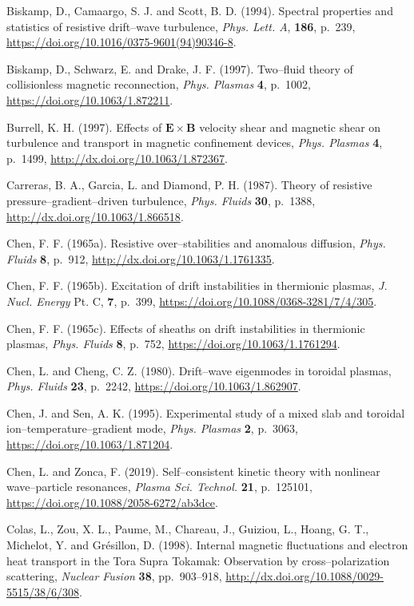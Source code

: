 \documentclass[a4paper,openany,12pt]{book}
\begin{document}
{\begin{thebibliography}{100}
\bibitem{}
Biskamp, D., Camaargo, S. J. and Scott, B. D. (1994). Spectral properties and statistics of resistive drift--wave turbulence, {\em Phys. Lett. A}, \textbf{186}, p.~239, \url{https://doi.org/10.1016/0375-9601(94)90346-8}.

\bibitem{}
Biskamp, D., Schwarz, E. and Drake, J. F. (1997). Two--fluid theory of collisionless magnetic reconnection, \emph{Phys. Plasmas} \textbf{4}, p.~1002, \url{https://doi.org/10.1063/1.872211}.

\bibitem{}
Burrell, K. H. (1997). Effects of $\bm{E\times B}$ velocity shear and magnetic shear on turbulence and transport in magnetic confinement devices, \emph{Phys. Plasmas} \textbf{4}, p.~1499, \url{http://dx.doi.org/10.1063/1.872367}.

\bibitem{}
Carreras, B. A., Garcia, L. and Diamond, P. H. (1987). Theory of resistive pressure--gradient--driven turbulence, \emph{Phys. Fluids} \textbf{30}, p.~1388, \url{http://dx.doi.org/10.1063/1.866518}.

\bibitem{}
Chen, F. F. (1965a). Resistive over--stabilities and anomalous diffusion, \emph{Phys. Fluids} \textbf{8}, p.~912,  
\url{http://dx.doi.org/10.1063/1.1761335}.

\bibitem{}
Chen, F. F. (1965b). Excitation of drift instabilities in thermionic plasmas, \emph{J. Nucl. Energy} Pt. C, \textbf{7}, 
p.~399, \url{https://doi.org/10.1088/0368-3281/7/4/305}.

\bibitem{}
Chen, F. F. (1965c). Effects of sheaths on drift instabilities in thermionic plasmas, \emph{Phys. Fluids} \textbf{8}, p.~752, \url{https://doi.org/10.1063/1.1761294}.

\bibitem{}
Chen, L. and Cheng, C. Z. (1980). Drift--wave eigenmodes in toroidal plasmas, \emph{Phys. Fluids} \textbf{23}, p.~2242, \url{https://doi.org/10.1063/1.862907}.

\bibitem{}
Chen, J. and Sen, A. K. (1995). Experimental study of a mixed slab and toroidal ion--temperature--gradient mode, \emph{Phys. Plasmas} \textbf{2}, p.~3063, \url{https://doi.org/10.1063/1.871204}.

\bibitem{}
Chen, L. and Zonca, F. (2019). Self--consistent kinetic theory with nonlinear wave--particle resonances, \emph{Plasma Sci. Technol.} \textbf{21}, p.~125101, \url{https://doi.org/10.1088/2058-6272/ab3dce}.

\bibitem{}
Colas, L., Zou, X. L., Paume, M., Chareau, J., Guiziou, L., Hoang, G. T., Michelot, Y. and Gr\'esillon, D. (1998). Internal magnetic fluctuations and electron heat transport in the Tora Supra Tokamak: Observation by cross--polarization scattering, \emph{Nuclear Fusion} \textbf{38}, pp.~903--918, \url{http://dx.doi.org/10.1088/0029-5515/38/6/308}.


\end{thebibliography}}
\end{document}

